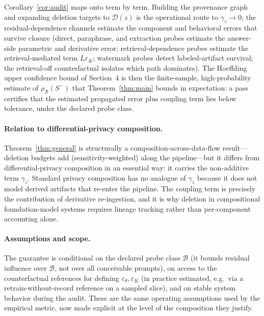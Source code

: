 Corollary~\ref{cor:audit} maps onto \method{} term by term. Building the
provenance graph and expanding deletion targets to $\mathcal{D}(z)$ is
the operational route to $\gamma_{z}\to 0$; the residual-dependence
channels estimate the component and behavioral errors that survive
closure (direct, paraphrase, and extraction probes estimate the
answer-side parametric and derivative error; retrieval-dependence probes
estimate the retrieval-mediated term $L\varepsilon_{K}$; watermark
probes detect labeled-artifact survival; the retrieval-off counterfactual
isolates which path dominates). The Hoeffding upper confidence bound of
Section~4 is then the finite-sample, high-probability estimate of
$\rho_{\mathcal{B}}(S^{-})$ that Theorem~\ref{thm:main} bounds in
expectation: a pass certifies that the estimated propagated error plus
coupling term lies below tolerance, under the declared probe class.

\paragraph{Relation to differential-privacy composition.}
Theorem~\ref{thm:general} is structurally a composition-across-data-flow
result---deletion budgets add (sensitivity-weighted) along the
pipeline---but it differs from differential-privacy composition in an
essential way: it carries the non-additive term $\gamma_{z}$. Standard
privacy composition has no analogue of $\gamma_{z}$ because it does not
model derived artifacts that re-enter the pipeline. The coupling term is
precisely the contribution of derivative re-ingestion, and it is why
deletion in compositional foundation-model systems requires lineage
tracking rather than per-component accounting alone.

\paragraph{Assumptions and scope.}
The guarantee is conditional on the declared probe class $\mathcal{B}$
(it bounds residual influence over $\mathcal{B}$, not over all
conceivable prompts), on access to the counterfactual references for
defining $\varepsilon_{\theta},\varepsilon_{K}$ (in practice estimated,
e.g.\ via a retrain-without-record reference on a sampled slice), and on
stable system behavior during the audit. These are the same operating
assumptions used by the empirical metric, now made explicit at the level
of the composition they justify.
